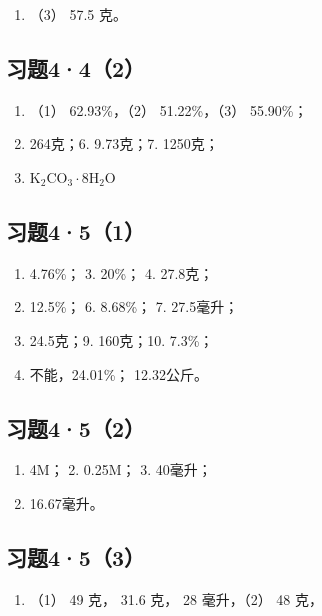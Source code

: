 \begin{enumerate}[start=2]
\item
  （3） 57.5 克。
\end{enumerate}

\subsection{习题4·4（2）}

\begin{enumerate}[start=4]
\item
  （1） 62.93\%，（2） 51.22\%，（3） 55.90\%；
\item
  264克；6. 9.73克；7. 1250克；
\item
  \(\mathrm{K}_2\mathrm{CO}_3\cdot 8\mathrm{H}_2\mathrm{O}\)
\end{enumerate}

\subsection{习题4·5（1）}

\begin{enumerate}[start=2]
\item
  4.76\%； 3. 20\%； 4. 27.8克；
\item
  12.5\%； 6. 8.68\%； 7. 27.5毫升；
\item
  24.5克；9. 160克；10. 7.3\%；
\item
  不能，24.01\%； 12.32公斤。
\end{enumerate}

\subsection{习题4·5（2）}

\begin{enumerate}
\item
  4M； 2. 0.25M； 3. 40毫升；
\item
  16.67毫升。
\end{enumerate}

\subsection{习题4·5（3）}

\begin{enumerate}[start=2]
\item
  （1） 49 克， 31.6 克， 28 毫升，（2） 48 克，
\end{enumerate}

